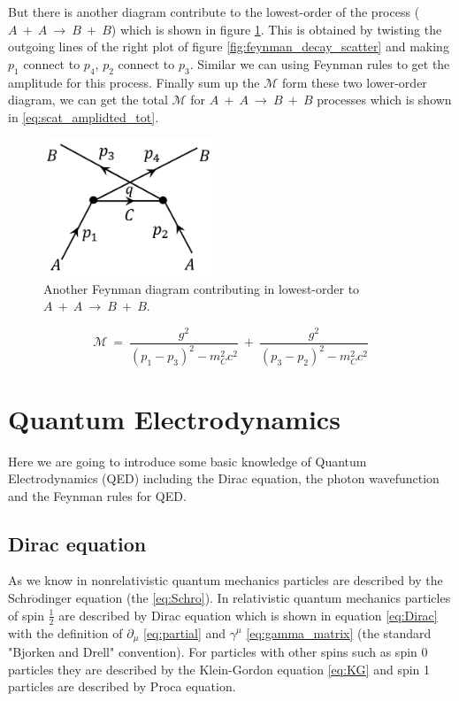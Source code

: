 But there is another diagram contribute to the lowest-order of the process ($A~+~A~\rightarrow~B~+~B$) which is shown in figure \ref{fig:feynman_scatter_2}. This is obtained by twisting the outgoing lines of the right plot of figure \ref{fig:feynman_decay_scatter} and making $p_{1}$ connect to $p_{4}$, $p_{2}$ connect to $p_{3}$. Similar we can using Feynman rules to get the amplitude for this process. Finally sum up the $\mathcal{M}$ form these two lower-order diagram, we can get the total $\mathcal{M}$ for $A~+~A~\rightarrow~B~+~B$ processes which is shown in \ref{eq:scat_amplidted_tot}.
\begin{figure}[h!]
 \begin{center}
\includegraphics[width=0.45\textwidth]{figures/theory/feynman_scatter_2.png}
\caption{Another Feynman diagram contributing in lowest-order to $A~+~A~\rightarrow~B~+~B$.}
  \label{fig:feynman_scatter_2}
 \end{center}
\end{figure}
\begin{equation}
\mathcal{M}~=~\frac{g^{2}}{(p_{1}-p_{3})^{2}-m_{C}^{2}c^{2}}~+~\frac{g^{2}}{(p_{3}-p_{2})^{2}-m_{C}^{2}c^{2}}
\label{eq:scat_amplidted_tot}
\end{equation}

\clearpage
\section{Quantum Electrodynamics}\label{subsec:QED}
Here we are going to introduce some basic knowledge of Quantum Electrodynamics (QED) including the Dirac equation, the photon wavefunction and the Feynman rules for QED.
\subsection{Dirac equation}\label{subsec:Dirac}
As we know in nonrelativistic quantum mechanics particles are described by the Schr$\mathrm{\ddot{o}}$dinger equation (the \ref{eq:Schro}). In relativistic quantum mechanics  particles of spin $\frac{1}{2}$ are described by Dirac equation which is shown in equation \ref{eq:Dirac} with the definition of $\partial_{\mu}$ \ref{eq:partial} and $\gamma^{\mu}$ \ref{eq:gamma_matrix} (the standard "Bjorken and Drell" convention). For particles with other spins such as spin 0 particles they are described by the Klein-Gordon equation \ref{eq:KG} and spin 1 particles are described by Proca equation.

